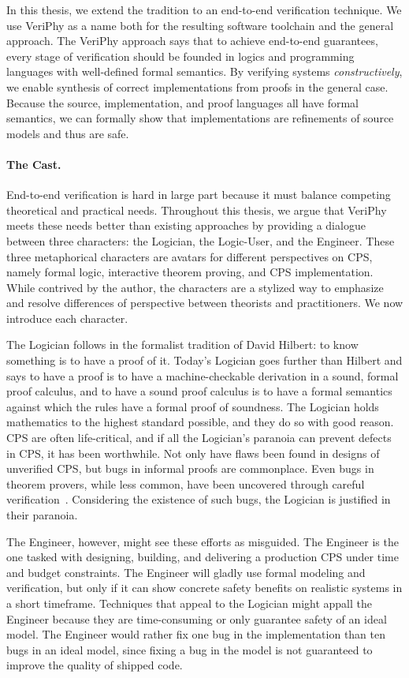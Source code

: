 \documentclass[12pt]{cmuthesis}
\theoremstyle{definition}
\theoremstyle{remark}
\newcommand{\VeriPhy}{VeriPhy\xspace}
\begin{document}
In this thesis, we extend the \dL tradition to an end-to-end verification technique.
We use \VeriPhy as a name both for the resulting software toolchain and the general approach.
The \VeriPhy approach says that to achieve end-to-end guarantees, every stage of verification should be founded in logics and programming languages with well-defined formal semantics.
By verifying systems \emph{constructively}, we enable synthesis of correct implementations from proofs in the general case.
Because the source, implementation, and proof languages all have formal semantics, we can formally show that implementations are refinements of source models and thus are safe.

\paragraph{The Cast.}
End-to-end verification is hard in large part because it must balance competing theoretical and practical needs.
Throughout this thesis, we argue that \VeriPhy meets these needs better than existing approaches by providing a dialogue between three characters: the Logician, the Logic-User, and the Engineer.
These three metaphorical characters are avatars for different perspectives on CPS, namely formal logic, interactive theorem proving, and CPS implementation.
While contrived by the author, the characters are a stylized way to emphasize and resolve differences of perspective between theorists and practitioners.
We now introduce each character.

The Logician follows in the formalist tradition of David Hilbert: to know something is to have a proof of it.
Today's Logician goes further than Hilbert and says to have a proof is to have a machine-checkable derivation in a sound, formal proof calculus, and to have a sound proof calculus is to have a formal semantics against which the rules have a formal proof of soundness.
The Logician holds mathematics to the highest standard possible, and they do so with good reason.
CPS are often life-critical, and if all the Logician's paranoia can prevent defects in CPS, it has been worthwhile.
Not only have flaws been found in designs of unverified CPS, but bugs in informal proofs are commonplace.
Even bugs in theorem provers, while less common, have been uncovered through careful verification~\cite{DBLP:conf/cpp/BohrerRVVP17}.
Considering the existence of such bugs, the Logician is justified in their paranoia.

The Engineer, however, might see these efforts as misguided.
The Engineer is the one tasked with designing, building, and delivering a production CPS under time and budget constraints.
The Engineer will gladly use formal modeling and verification, but only if it can show concrete safety benefits on realistic systems in a short timeframe.
Techniques that appeal to the Logician might appall the Engineer because they are time-consuming or only guarantee safety of an ideal model.
The Engineer would rather fix one bug in the implementation than ten bugs in an ideal model, since fixing a bug in the model is not guaranteed to improve the quality of shipped code.
\end{document}
